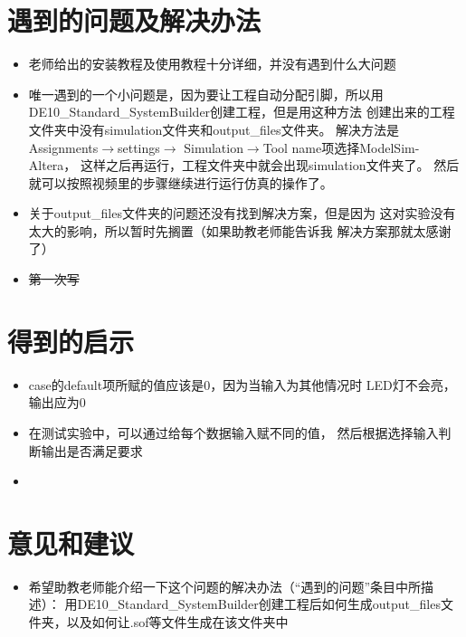 \documentclass[12pt,a4paper,UTF8]{article}
\begin{document}
\section{遇到的问题及解决办法}
\begin{itemize}
  \item 老师给出的安装教程及使用教程十分详细，并没有遇到什么大问题
  \item 唯一遇到的一个小问题是，因为要让工程自动分配引脚，所以用\linebreak[4]
        DE10\_Standard\_SystemBuilder创建工程，但是用这种方法
        创建出来的工程文件夹中没有simulation文件夹和output\_files文件夹。
        解决方法是Assignments$\rightarrow$settings$\rightarrow$
        Simulation$\rightarrow$Tool name项选择ModelSim-Altera，
        这样之后再运行，工程文件夹中就会出现simulation文件夹了。
        然后就可以按照视频里的步骤继续进行运行仿真的操作了。
  \item 关于output\_files文件夹的问题还没有找到解决方案，但是因为
        这对实验没有太大的影响，所以暂时先搁置（如果助教老师能告诉我
        解决方案那就太感谢了）
  \item \sout{第一次写}
\end{itemize}

\section{得到的启示}
\begin{itemize}
  \item case的default项所赋的值应该是0，因为当输入为其他情况时
        LED灯不会亮，输出应为0
  \item 在测试实验中，可以通过给每个数据输入赋不同的值，
        然后根据选择输入判断输出是否满足要求
  \item \sout{}
\end{itemize}

\section{意见和建议}
\begin{itemize}
  \item 希望助教老师能介绍一下这个问题的解决办法（``遇到的问题''条目中所描述）：
        用DE10\_Standard\_SystemBuilder创建工程后如何生成\linebreak[4]
        output\_files文件夹，以及如何让.sof等文件生成在该文件夹中
\end{itemize}
\end{document}
